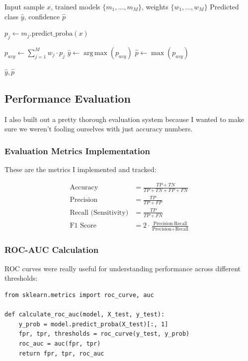 \documentclass[12pt]{article}
\DeclareMathOperator*{\argmax}{arg\,max}
\begin{document}
\begin{algorithm}[H]
\caption{Soft Voting Prediction}
\begin{algorithmic}[1]
\Require Input sample $x$, trained models $\{m_1, ..., m_M\}$, weights $\{w_1, ..., w_M\}$
\Ensure Predicted class $\hat{y}$, confidence $\hat{p}$

    \State $p_j \gets m_j.\text{predict\_proba}(x)$ 
\EndFor

\State $p_{avg} \gets \sum_{j=1}^{M} w_j \cdot p_j$ 
\State $\hat{y} \gets \argmax(p_{avg})$
\State $\hat{p} \gets \max(p_{avg})$ 

\State \Return $\hat{y}, \hat{p}$
\end{algorithmic}
\end{algorithm}

\subsection{Performance Evaluation}

I also built out a pretty thorough evaluation system because I wanted to make sure we weren't fooling ourselves with just accuracy numbers.

\subsubsection{Evaluation Metrics Implementation}
These are the metrics I implemented and tracked:

\begin{align}
\text{Accuracy} &= \frac{TP + TN}{TP + TN + FP + FN} \\[0.5em]
\text{Precision} &= \frac{TP}{TP + FP} \\[0.5em]
\text{Recall (Sensitivity)} &= \frac{TP}{TP + FN} \\[0.5em]
\text{F1 Score} &= 2 \cdot \frac{\text{Precision} \cdot \text{Recall}}{\text{Precision} + \text{Recall}}
\end{align}

\subsubsection{ROC-AUC Calculation}
ROC curves were really useful for understanding performance across different thresholds:

\begin{lstlisting}[style=pythonstyle, caption={ROC-AUC Calculation}]
from sklearn.metrics import roc_curve, auc

def calculate_roc_auc(model, X_test, y_test):
    y_prob = model.predict_proba(X_test)[:, 1]
    fpr, tpr, thresholds = roc_curve(y_test, y_prob)
    roc_auc = auc(fpr, tpr)
    return fpr, tpr, roc_auc
\end{lstlisting}
\end{document}
